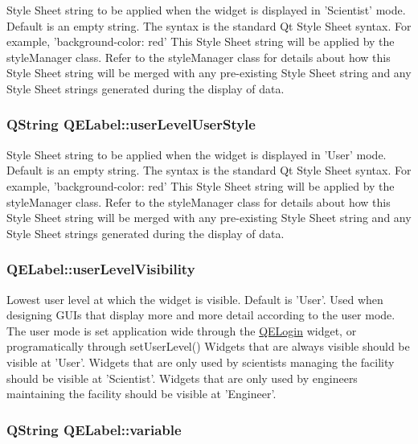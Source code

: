 \label{classQELabel_a0db32f7f413a0f90922bf905457e84ff}
Style Sheet string to be applied when the widget is displayed in 'Scientist' mode. Default is an empty string. The syntax is the standard Qt Style Sheet syntax. For example, 'background-\/color: red' This Style Sheet string will be applied by the styleManager class. Refer to the styleManager class for details about how this Style Sheet string will be merged with any pre-\/existing Style Sheet string and any Style Sheet strings generated during the display of data. \hypertarget{classQELabel_a3838985f30193aca5ebbcf95d1568a02}{
\subsubsection[{userLevelUserStyle}]{\setlength{\rightskip}{0pt plus 5cm}QString QELabel::userLevelUserStyle}}
\label{classQELabel_a3838985f30193aca5ebbcf95d1568a02}
Style Sheet string to be applied when the widget is displayed in 'User' mode. Default is an empty string. The syntax is the standard Qt Style Sheet syntax. For example, 'background-\/color: red' This Style Sheet string will be applied by the styleManager class. Refer to the styleManager class for details about how this Style Sheet string will be merged with any pre-\/existing Style Sheet string and any Style Sheet strings generated during the display of data. \hypertarget{classQELabel_a8e553fceee2d1bcb5b2e6fbacbc100d6}{
\subsubsection[{userLevelVisibility}]{ QELabel::userLevelVisibility}}
\label{classQELabel_a8e553fceee2d1bcb5b2e6fbacbc100d6}
Lowest user level at which the widget is visible. Default is 'User'. Used when designing GUIs that display more and more detail according to the user mode. The user mode is set application wide through the \hyperlink{classQELogin}{QELogin} widget, or programatically through setUserLevel() Widgets that are always visible should be visible at 'User'. Widgets that are only used by scientists managing the facility should be visible at 'Scientist'. Widgets that are only used by engineers maintaining the facility should be visible at 'Engineer'. \hypertarget{classQELabel_a3ca3590d22697395ec79c29335987ed3}{
\subsubsection[{variable}]{\setlength{\rightskip}{0pt plus 5cm}QString QELabel::variable}}
